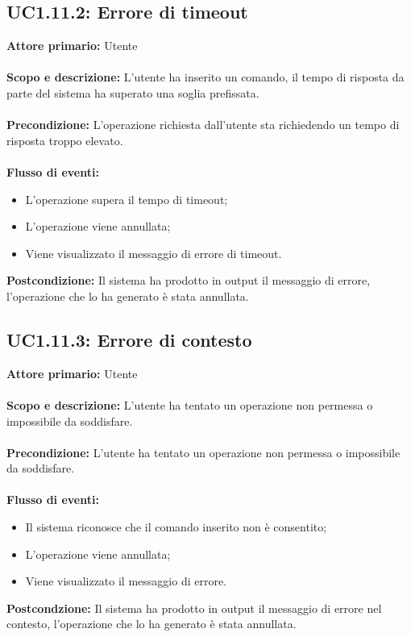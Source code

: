 \documentclass{scalatekids-article}
\begin{document}
\subsection{UC1.11.2: Errore di timeout}
\textbf{Attore primario:} Utente \\ \\
\textbf{Scopo e descrizione:} L'utente ha inserito un comando, il tempo di risposta da parte del sistema ha superato una soglia prefissata.\\ \\
\textbf{Precondizione:} L'operazione richiesta dall'utente sta richiedendo un tempo di risposta troppo elevato.\\ \\
\textbf{Flusso di eventi:}
\begin{itemize}
\item L'operazione supera il tempo di timeout;
\item L'operazione viene annullata;
\item Viene visualizzato il messaggio di errore di timeout.
\end{itemize}
\textbf{Postcondizione:} Il sistema ha prodotto in output il messaggio di errore, l'operazione che lo ha generato è stata annullata.
\subsection{UC1.11.3: Errore di contesto}
\textbf{Attore primario:} Utente \\ \\
\textbf{Scopo e descrizione:} L'utente ha tentato un operazione non permessa o impossibile da soddisfare.\\ \\
\textbf{Precondizione:} L'utente ha tentato un operazione non permessa o impossibile da soddisfare.\\ \\
\textbf{Flusso di eventi:}
\begin{itemize}
\item Il sistema riconosce che il comando inserito non è consentito;
\item L'operazione viene annullata;
\item Viene visualizzato il messaggio di errore.
\end{itemize}
\textbf{Postcondzione:} Il sistema ha prodotto in output il messaggio di errore nel contesto, l'operazione che lo ha generato è stata annullata.
\end{document}
